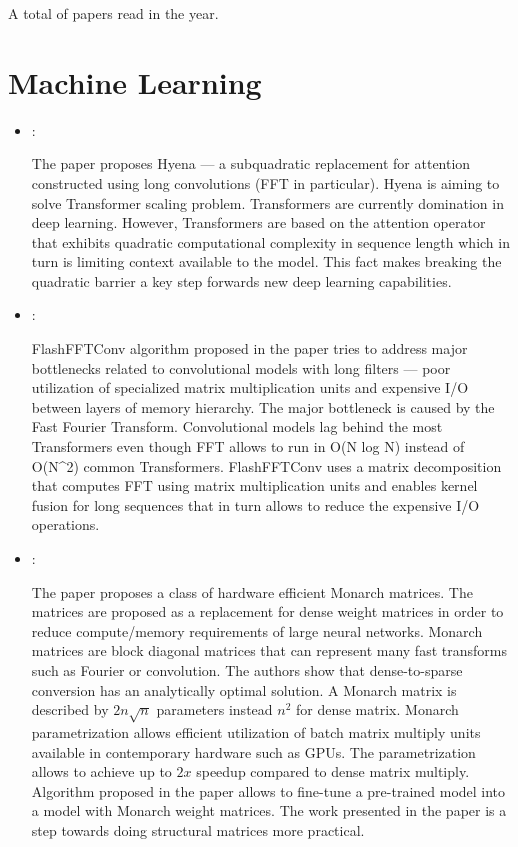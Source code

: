 



A total of  papers read in the year.


\section*{Machine Learning}
\begin{itemize}
    \item \cite{Poli:Hyena:2023}:

    The paper proposes Hyena --- a subquadratic replacement for attention constructed using long convolutions (FFT in particular). Hyena is aiming to solve Transformer scaling problem. Transformers are currently domination in deep learning. However, Transformers are based on the attention operator that exhibits quadratic computational complexity in sequence length which in turn is limiting context available to the model. This fact makes breaking the quadratic barrier a key step forwards new deep learning capabilities.

    \item \cite{Fu:FlashFFTConv:2024}:

    FlashFFTConv algorithm proposed in the paper tries to address major bottlenecks related to convolutional models with long filters --- poor utilization of specialized matrix multiplication units and expensive I/O between layers of memory hierarchy. The major bottleneck is caused by the Fast Fourier Transform. Convolutional models lag behind the most Transformers even though FFT allows to run in O(N log N) instead of  O(N^2) common Transformers. FlashFFTConv uses a matrix decomposition that computes FFT using matrix multiplication units and enables kernel fusion for long sequences that in turn allows to reduce the expensive I/O operations.

    \item \cite{Dao:Monarch:2022}:

    The paper proposes a class of hardware efficient Monarch matrices. The matrices are proposed as a replacement for dense weight matrices in order to reduce compute/memory requirements of large neural networks. Monarch matrices are block diagonal matrices that can represent many fast transforms such as Fourier or convolution. The authors show that dense-to-sparse conversion has an analytically optimal solution. A Monarch matrix is described by $2n\sqrt{n}$ parameters instead $n^2$ for dense matrix. Monarch parametrization allows efficient utilization of batch matrix multiply units available in contemporary hardware such as GPUs. The parametrization allows to achieve up to $2x$ speedup compared to dense matrix multiply. Algorithm proposed in the paper allows to fine-tune a pre-trained model into a model with Monarch weight matrices. The work presented in the paper is a step towards doing structural matrices more practical.
\end{itemize}

